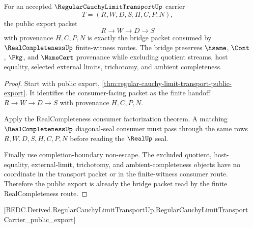 \begin{theorem}
\label{thm:regular-cauchy-limit-transport-bridge-packet}
For an accepted $\RegularCauchyLimitTransportUp$ carrier
$$
T=(R,W,D,S,H,C,P,N),
$$
the public export packet
$$
R \to W \to D \to S
$$
with provenance $H,C,P,N$ is exactly the bridge packet consumed by $\RealCompletenessUp$ finite-witness routes. The bridge preserves $\hsame$, $\Cont$, $\Pkg$, and $\NameCert$ provenance while excluding quotient streams, host equality, selected external limits, trichotomy, and ambient completeness.
\end{theorem}
\begin{proof}
Start with public export, \autoref{thm:regular-cauchy-limit-transport-public-export}. It identifies the consumer-facing packet as the finite handoff $R \to W \to D \to S$ with provenance $H,C,P,N$.

Apply the RealCompleteness consumer factorization theorem. A matching $\RealCompletenessUp$ diagonal-seal consumer must pass through the same rows $R,W,D,S,H,C,P,N$ before reading the $\RealUp$ seal.

Finally use completion-boundary non-escape. The excluded quotient, host-equality, external-limit, trichotomy, and ambient-completeness objects have no coordinate in the transport packet or in the finite-witness consumer route. Therefore the public export is already the bridge packet read by the finite RealCompleteness route.
\end{proof}

[BEDC.Derived.RegularCauchyLimitTransportUp.RegularCauchyLimitTransportCarrier\_public\_export]

